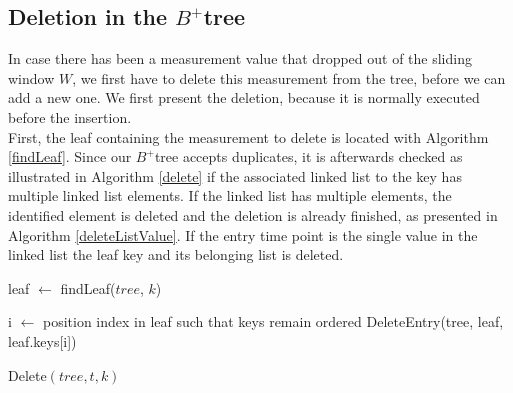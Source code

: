 \documentclass[abstracton,12pt,oneside]{scrreprt}
\begin{document}
\subsection{Deletion in the $B^+$tree}
\label{deleteTree}
In case there has been a measurement value that dropped out of the sliding window $W$, we first have to delete this measurement from the tree, before we can add a new one. We first present the deletion, because it is normally executed before the insertion. \\
First, the leaf containing the measurement to delete is located with Algorithm \ref{findLeaf}. Since our $B^+$tree accepts duplicates, it is afterwards checked as illustrated in Algorithm \ref{delete} if the associated linked list to the key has multiple linked list elements. If the linked list has multiple elements, the identified element is deleted and the deletion is already finished, as presented in Algorithm \ref{deleteListValue}. If the entry time point is the single value in the linked list the leaf key and its belonging list is deleted.

\begin{algorithm}[H]
	\IncMargin{1em}
	\SetAlgoLined
	\DontPrintSemicolon
	
	
	leaf $\leftarrow$ findLeaf($tree$, $k$)\; 
	
	i $\leftarrow$ position index in leaf such that keys remain ordered\;
	\BlankLine
	{
		DeleteEntry(tree, leaf, leaf.keys[i])\; 
	}	
	
	
	\caption{Delete$(tree, t, k)$}	\label{delete}
\end{algorithm}
\end{document}
